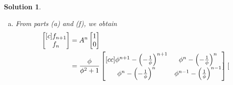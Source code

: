 \documentclass[11pt]{scrartcl}
\theoremstyle{dotlessP}
\newtheorem{sol}{Solution}[section]
\theoremstyle{dotlessN}
\DeclarePairedDelimiter\paren{(}{)} %
\begin{document}
\begin{sol}
\begin{enumerate}[(a)]
We first calculate $P^{-1}$.
\begin{align*}
	\frac{1}{\det P}
	\begin{bmatrix}
		1 & \frac{1}{\phi} \\
		-1 & \phi
	\end{bmatrix} = 
	\frac{\phi}{\phi^2 + 1}
	\begin{bmatrix}
		1 & \frac{1}{\phi} \\
		-1 & \phi
	\end{bmatrix}  
\end{align*}
\begin{align*}
	A^n &= 
\begin{bmatrix}
	\phi & -\frac{1}{\phi} \\
	1 & 1
\end{bmatrix}
\begin{bmatrix}[cc]
	\phi^n & 0 \\
0 & \paren*{-\frac{1}{\phi}}^n
\end{bmatrix}
\paren*{\frac{\phi}{\phi^2 + 1}
	\begin{bmatrix}
		1 & \frac{1}{\phi} \\
		-1 & \phi
\end{bmatrix}} \\
		&= 
		\frac{\phi}{\phi^2 + 1}
		\begin{bmatrix}[cc]
			\phi^{n+1} - \paren*{-\frac{1}{\phi}}^{n+1} & \phi^n - \paren*{-\frac{1}{\phi}}^n \\
			\phi^n - \paren*{-\frac{1}{\phi}}^n & \phi^{n-1} - \paren*{\frac{1}{\phi}}^{n-1}
		\end{bmatrix}
\end{align*}
\item From parts (a) and (f), we obtain
	\begin{align*}
		\begin{bmatrix}[c]
			f_{n+1} \\
			f_n
		\end{bmatrix} &= 
		A^n 
		\begin{bmatrix}
			1 \\
			0
		\end{bmatrix} \\
		&= 
		\frac{\phi}{\phi^2 + 1}
		\begin{bmatrix}[cc]
			\phi^{n+1} - \paren*{-\frac{1}{\phi}}^{n+1} & \phi^n - \paren*{-\frac{1}{\phi}}^n \\
			\phi^n - \paren*{-\frac{1}{\phi}}^n & \phi^{n-1} - \paren*{\frac{1}{\phi}}^{n-1}
		\end{bmatrix}
\begin{bmatrix}

\end{bmatrix}
\end{align*}
\end{enumerate}
\end{sol}
\end{document}

